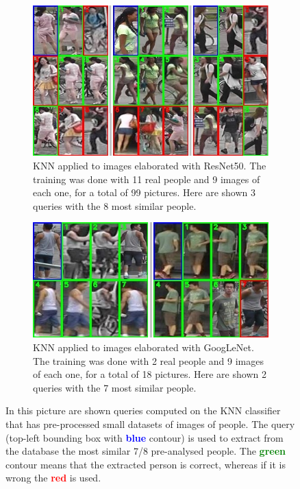 \begin{figure}[!h]
	\centering
	\begin{subfigure}{1\textwidth}
		\includegraphics[width=\linewidth]{images/recognition/knn_resNet_s9n99}
		\captionsetup{margin=0.5cm}
		\caption{KNN applied to images elaborated with ResNet50. The training was done with 11 real people and 9 images of each one, for a total of 99 pictures. Here are shown 3 queries with the 8 most similar people.}
		\label{fig:knn_resNet_s9n99}
	\end{subfigure}
	\par\bigskip %
	\begin{subfigure}{1\textwidth}
		\includegraphics[width=\linewidth]{images/recognition/knn_googleNet_s9n18}
		\captionsetup{margin=0.5cm}
		\caption{KNN applied to images elaborated with GoogLeNet. The training was done with 2 real people and 9 images of each one, for a total of 18 pictures. Here are shown 2 queries with the 7 most similar people.}
		\label{fig:knn_googleNet_s9n18}
	\end{subfigure}
	\captionsetup{margin=0.5cm}
	\caption[KNN applied with image classifier to solve the person re-identification task.]{In this picture are shown queries computed on the KNN classifier that has pre-processed small datasets of images of people. The query (top-left bounding box with \textbf{\textcolor{blue}{blue}} contour) is used to extract from the database the most similar 7/8 pre-analysed people. The \textbf{\textcolor{green}{green}} contour means that the extracted person is correct, whereas if it is wrong the \textbf{\textcolor{red}{red}} is used.}
	\label{fig:knn_reID_examples}
\end{figure}